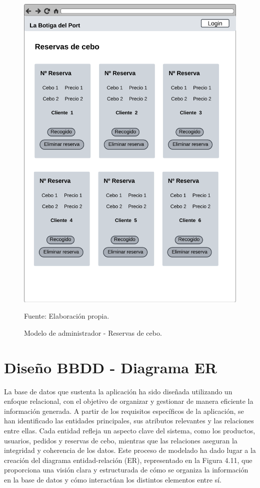 \begin{figure}[H]
\begin{center}
\includegraphics[scale=0.5]{./Images/reserva_cebo_admin.png}
\caption{Modelo de administrador - Reservas de cebo.} Fuente: Elaboración propia.

\label{fig:fig10}

\end{center}
\end{figure}

\section{Diseño BBDD - Diagrama ER}\label{sec:apartado}

La base de datos que sustenta la aplicación ha sido diseñada utilizando un enfoque relacional, con el objetivo de organizar y gestionar de manera eficiente la información generada. A partir de los requisitos específicos de la aplicación, se han identificado las entidades principales, sus atributos relevantes y las relaciones entre ellas. Cada entidad refleja un aspecto clave del sistema, como los productos, usuarios, pedidos y reservas de cebo, mientras que las relaciones aseguran la integridad y coherencia de los datos. Este proceso de modelado ha dado lugar a la creación del diagrama entidad-relación (ER), representado en la \textcolor{naranja}{Figura 4.11}, que proporciona una visión clara y estructurada de cómo se organiza la información en la base de datos y cómo interactúan los distintos elementos entre sí.

